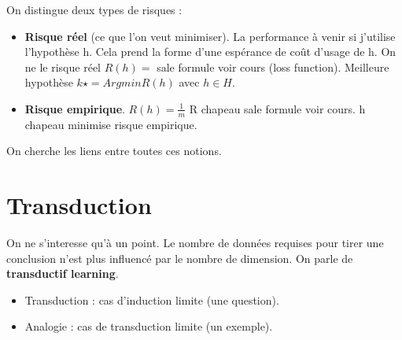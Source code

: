 \documentclass{article}
\begin{document}
On distingue deux types de risques :

\begin{itemize}
\item \textbf{Risque réel} (ce que l'on veut minimiser). La performance à venir si j'utilise l'hypothèse h. Cela prend la forme d'une espérance de coût d'usage de h. On ne le risque réel $R(h) = $ sale formule voir cours (loss function). Meilleure hypothèse $k\star = Argmin R(h)$ avec $h \in H$.
\item \textbf{Risque empirique}. $R(h) = \frac{1}{m}$ R chapeau sale formule voir cours. h chapeau minimise risque empirique.
\end{itemize}

On cherche les liens entre toutes ces notions.

\section{Transduction}

On ne s'interesse qu'à un point. Le nombre de données requises pour tirer une conclusion n'est plus influencé par le nombre de dimension. On parle de \textbf{transductif learning}.
\begin{itemize}
\item Transduction : cas d'induction limite (une question).
\item Analogie : cas de transduction limite (un exemple).
\end{itemize}
\end{document}
